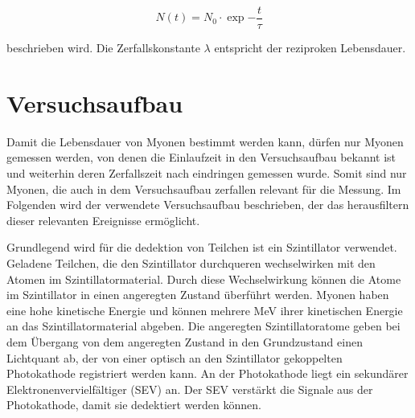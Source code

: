 \begin{equation}
  \label{eqn:Lebensdauer}
  N(t) = N_0\cdot\exp{-\frac{t}{\tau}}
\end{equation}

beschrieben wird. Die Zerfallskonstante $\lambda$ entspricht der reziproken
Lebensdauer.





\section{Versuchsaufbau}

Damit die Lebensdauer von Myonen bestimmt werden kann, dürfen nur
Myonen gemessen werden, von denen die Einlaufzeit in den Versuchsaufbau bekannt ist
und weiterhin deren Zerfallszeit nach eindringen gemessen wurde.
Somit sind nur Myonen, die auch in dem Versuchsaufbau zerfallen relevant
für die Messung. Im Folgenden wird der verwendete Versuchsaufbau beschrieben,
der das herausfiltern dieser relevanten Ereignisse ermöglicht.

Grundlegend wird für die dedektion von Teilchen ist ein Szintillator verwendet.
Geladene Teilchen, die den Szintillator durchqueren wechselwirken mit den Atomen
im Szintillatormaterial. Durch diese Wechselwirkung können
die Atome im Szintillator in einen angeregten Zustand überführt werden.
Myonen haben eine hohe kinetische Energie und können mehrere MeV ihrer kinetischen Energie
an das Szintillatormaterial abgeben. Die angeregten Szintillatoratome geben
bei dem Übergang von dem angeregten Zustand in den Grundzustand einen Lichtquant
ab, der von einer optisch an den Szintillator gekoppelten Photokathode
registriert werden kann.
An der Photokathode liegt ein sekundärer Elektronenvervielfältiger (SEV) an.
Der SEV verstärkt die Signale aus der Photokathode, damit sie dedektiert werden
können.


